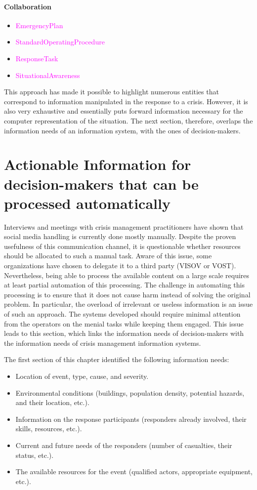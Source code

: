 \paragraph{Collaboration}
\begin{itemize}
    \item \textcolor{magenta}{EmergencyPlan}
    \item \textcolor{magenta}{StandardOperatingProcedure}
    \item \textcolor{magenta}{ResponseTask}
    \item \textcolor{magenta}{SituationalAwareness}
\end{itemize}

This approach has made it possible to highlight numerous entities that correspond to information manipulated in the response to a crisis.
However, it is also very exhaustive and essentially puts forward information necessary for the computer representation of the situation.
The next section, therefore, overlaps the information needs of an information system, with the ones of decision-makers.

\section{Actionable Information for decision-makers that can be processed automatically}
Interviews and meetings with crisis management practitioners have shown that social media handling is currently done mostly manually.
Despite the proven usefulness of this communication channel, it is questionable whether resources should be allocated to such a manual task.
Aware of this issue, some organizations have chosen to delegate it to a third party (VISOV or VOST).
Nevertheless, being able to process the available content on a large scale requires at least partial automation of this processing.
The challenge in automating this processing is to ensure that it does not cause harm instead of solving the original problem.
In particular, the overload of irrelevant or useless information is an issue of such an approach.
The systems developed should require minimal attention from the operators on the menial tasks while keeping them engaged.
This issue leads to this section, which links the information needs of decision-makers with the information needs of crisis management information systems.

The first section of this chapter identified the following information needs:

\begin{itemize}
    \item Location of event, type, cause, and severity.
    \item Environmental conditions (buildings, population density, potential hazards, and their location, etc.).
    \item Information on the response participants (responders already involved, their skills, resources, etc.).
    \item Current and future needs of the responders (number of casualties, their status, etc.).
    \item The available resources for the event (qualified actors, appropriate equipment, etc.).
\end{itemize}

